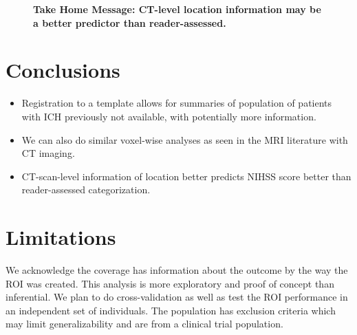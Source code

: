 \documentclass[final]{beamer}\usepackage[]{graphicx}\usepackage[]{color}
\begin{document}
\begin{frame}[fragile]
\begin{multicols}{2}
\begin{figure}[htbp]
\begin{minipage}[t]{0.65\linewidth}
{\begin{minipage}{\linewidth}

{\bf Take Home Message: CT-level location information may be a better predictor than reader-assessed.}
\end{minipage}
}
  \label{f:roi} 
\end{minipage}  
\end{figure}





\section{Conclusions}
\vspace*{-0.5cm}
\begin{itemize}
\item Registration to a template allows for summaries of population of patients with ICH previously not available, with potentially more information.  
\item We can also do similar voxel-wise analyses as seen in the MRI literature with CT imaging.
\item CT-scan-level information of location better predicts NIHSS score better than reader-assessed categorization.
\end{itemize}

\section{Limitations}
\vspace*{-0.5cm}

We acknowledge the coverage has information about the outcome by the way the ROI was created.  This analysis is more exploratory and proof of concept than inferential.  We plan to do cross-validation as well as test the ROI performance in an independent set of individuals.  The population has exclusion criteria which may limit generalizability and are from a clinical trial population. 





\end{multicols}

\end{frame}
\end{document}
